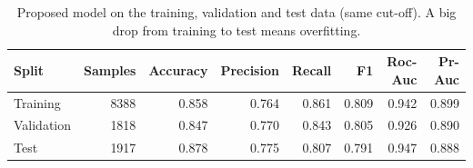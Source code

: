 \begin{table}[t]
\centering
\caption{Proposed model on the training, validation and test data (same cut-off). A big drop from training to test means overfitting.}
\label{tab:table7_train_val_test}
\begin{tabular}{lrrrrrrr}
\hline
Split & Samples & Accuracy & Precision & Recall & F1 & Roc-Auc & Pr-Auc \\
\hline
Training & 8388 & 0.858 & 0.764 & 0.861 & 0.809 & 0.942 & 0.899 \\
Validation & 1818 & 0.847 & 0.770 & 0.843 & 0.805 & 0.926 & 0.890 \\
Test & 1917 & 0.878 & 0.775 & 0.807 & 0.791 & 0.947 & 0.888 \\
\hline
\end{tabular}
\end{table}
